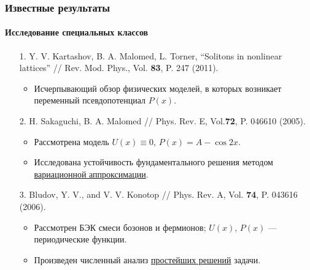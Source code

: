\documentclass [10pt] {beamer}
\begin{document}
\begin{frame}
	\frametitle{Известные результаты}
	\framesubtitle{Исследование специальных классов}
	
	\begin{small}
	\begin{enumerate}
		\setlength\itemsep{5pt}
		\item[1.] Y. V. Kartashov, B. A. Malomed, L. Torner, ``Solitons in nonlinear lattices'' // Rev. Mod. Phys., Vol. {\bf 83}, P. 247 (2011).
			\begin{itemize}
				\item Исчерпывающий обзор физических моделей, в которых возникает переменный псевдопотенциал $P(x)$.
			\end{itemize}
		\item[2.] H. Sakaguchi, B. A. Malomed // Phys. Rev. E, Vol.{\bf 72}, P. 046610 (2005).
			\begin{itemize}
				\item Рассмотрена модель $U(x) \equiv 0$, $P(x) = A - \cos 2x$.
				\item Исследована устойчивость фундаментального решения методом \underline{вариационной аппроксимации}.
			\end{itemize}
		\item[3.] Bludov, Y. V., and V. V. Konotop // Phys. Rev. A, Vol. {\bf 74}, P. 043616 (2006).
			\begin{itemize}
				\item Рассмотрен БЭК смеси бозонов и фермионов; $U(x)$, $P(x)$ --- периодические функции.
				\item Произведен численный анализ \underline{простейших решений} задачи.
			\end{itemize}
	\end{enumerate}
	\end{small}
\end{frame}
\end{document}
